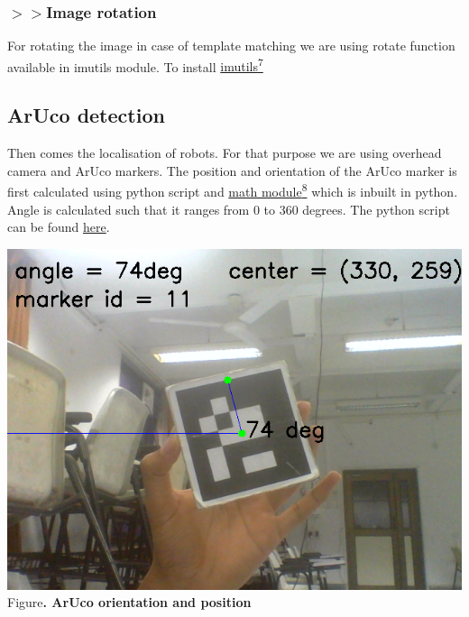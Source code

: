 \documentclass[a4paper,12pt,oneside]{book}
\begin{document}
\subsubsection*{$>>$Image rotation}
For rotating the image in case of template matching we are using rotate function available in imutils module. To install \href{https://www.pyimagesearch.com/2015/02/02/just-open-sourced-personal-imutils-package-series-opencv-convenience-functions/}{imutils\textsuperscript{7}}
\begin{center}
\framebox{\textcolor{gray}{pip install imutils}}
\end{center}
\subsection*{ArUco detection}
Then comes the localisation of robots. For that purpose we are using overhead camera and ArUco markers. The position and orientation of the ArUco marker is first calculated using python script and \href{https://docs.python.org/2/library/math.html}{math module\textsuperscript{8}} which is inbuilt in python. Angle is calculated such that it ranges from 0 to 360 degrees. The python script can be found \href{https://github.com/eYSIP-2018/Jigsaw_Puzzle_Solver_using_Multiple_Robots/blob/master/Scripts/ArUco detection orientation/Aruco_pose.py}{here}.
\begin{center}
\includegraphics[scale=0.5]{aruco.png}\\
\small{Figure\textbf{. ArUco orientation and position}}
\end{center}
\end{document}
